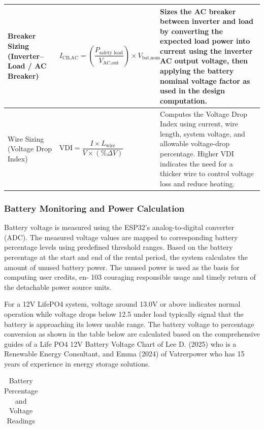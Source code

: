 {\begin{itemize}
\begin{longtable}{|p{3.1cm}|p{5.0cm}|p{4cm}|}
 	Breaker Sizing (Inverter--Load / AC Breaker)
 	&
 	$I_{\text{CB,AC}}=\left(\dfrac{P_{\text{safety load}}}{V_{\text{AC,out}}}\right)\times V_{\text{bat,nom}}$
 	&
 	Sizes the AC breaker between inverter and load by converting the expected load power into current using the inverter AC output voltage, then applying the battery nominal voltage factor as used in the design computation. \\
 	\hline
 	
 	Wire Sizing (Voltage Drop Index)
 	&
 	$\mathrm{VDI}=\dfrac{I\times L_{\text{wire}}}{V\times (\%\Delta V)}$
 	&
 	Computes the Voltage Drop Index using current, wire length, system voltage, and allowable voltage-drop percentage. Higher VDI indicates the need for a thicker wire to control voltage loss and reduce heating. \\
 	\hline
 	
 \end{longtable}
\end{itemize}

\subsubsection{Battery Monitoring and Power Calculation }

Battery voltage is measured using the ESP32’s analog-to-digital converter (ADC). The measured voltage values are mapped to corresponding battery percentage levels using predefined threshold ranges. Based on the battery percentage at the start and end of the rental period, the system calculates the amount of unused battery power. The unused power is used as the basis for computing user credits, en- 103 couraging responsible usage and timely return of the detachable power source units. 


For a 12V LifePO4 system, voltage around 13.0V or above indicates normal operation while voltage drops below 12.5 under load typically signal that the battery is approaching its lower usable range. The battery voltage to percentage conversion as shown in the table below are calculated based on the comprehensive guides of a Life PO4 12V Battery Voltage Chart of Lee D. (2025) who is a Renewable Energy Consultant, and Emma (2024) of Vatrerpower who has 15 years of experience in energy storage solutions. 



\renewcommand{\arraystretch}{1.4} 
\begin{longtable}{p{} p{} p{}}
    \caption{Battery Percentage and Voltage Readings} \label{tab:battery_readings} \\
    

\end{longtable}}
